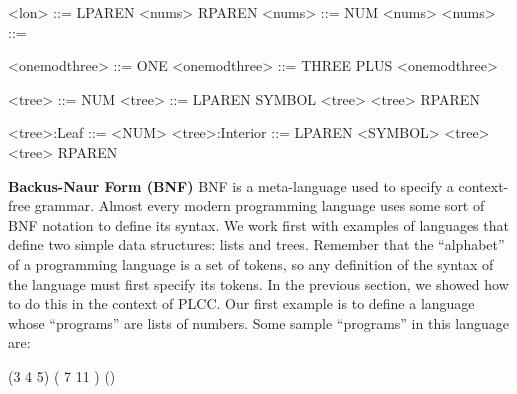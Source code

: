\begin{minipage}[t]{\sw}
\slidenumber
\begin{SaveVerbatim}{\MYlon}
<lon>  ::= LPAREN <nums> RPAREN
<nums> ::= NUM <nums>
<nums> ::=
\end{SaveVerbatim}
\begin{SaveVerbatim}{\MYonemodthree}
<onemodthree>  ::= ONE
<onemodthree>  ::= THREE PLUS <onemodthree>
\end{SaveVerbatim}
\begin{SaveVerbatim}{\MYtree}
<tree>  ::= NUM
<tree>  ::= LPAREN SYMBOL <tree> <tree> RPAREN
\end{SaveVerbatim}
\begin{SaveVerbatim}{\MYtreeTOK}
<tree>:Leaf     ::= <NUM>
<tree>:Interior ::= LPAREN <SYMBOL> <tree> <tree> RPAREN
\end{SaveVerbatim}
\LARGE
{\bf Backus-Naur Form (BNF)}\exx
BNF is a meta-language used
to specify a context-free grammar.
Almost every modern programming language uses some sort
of BNF notation to define its syntax.
We work first with examples of languages
that define two simple data structures:
lists and trees.
Remember that the ``alphabet'' of a programming language
is a set of tokens,
so any definition of the syntax of the language
must first specify its tokens.
In the previous section, we showed how to do this
in the context of PLCC.\exx
Our first example is to define a language whose ``programs''
are lists of numbers.
Some sample ``programs'' in this language are:
\begin{qv}
(3 4 5)
(    7 11  )
()
\end{qv}
\end{minipage}
\clearpage
